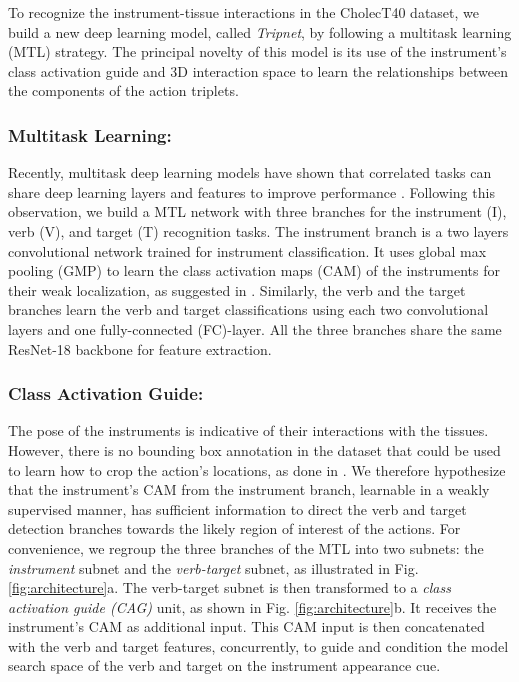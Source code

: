 \documentclass[english,runningheads,a4paper]{llncs}
\begin{document}
To recognize the instrument-tissue interactions in the CholecT40 dataset, we build a new deep learning model, called \textit{Tripnet}, by following a multitask learning (MTL) strategy. The principal novelty of this model is its use of the instrument's class activation guide and 3D interaction space to learn the relationships between the components of the action triplets.


\subsubsection{Multitask Learning: }
Recently, multitask deep learning models have shown that correlated tasks can share deep learning layers and features to improve performance \cite{mondal2019multitask,jin2020multi}. Following this observation, we build a MTL network with three branches for the instrument (I), verb (V), and target (T) recognition tasks. 
The instrument branch is a two layers convolutional network trained for  instrument classification. It uses global max pooling (GMP) to learn the class activation maps (CAM) of the instruments for their weak localization, as suggested in \cite{nwoye_convlstm_ijcars2019}. 
Similarly, the verb and the target branches learn the verb and target classifications using each two convolutional layers and one fully-connected (FC)-layer. 
All the three branches share the same ResNet-18 backbone for feature extraction.


\subsubsection{Class Activation Guide: }
The pose of the instruments is indicative of their interactions with the tissues. However, there is no bounding box annotation in the dataset that could be used to learn how to crop the action's locations, as done in \cite{gkioxari_hoi_cvpr2018,xu_hoi_cvpr2019,qi_hoi_eccv2018,shen_hoi_wacv2018}. We therefore hypothesize that the instrument's CAM from the instrument branch, learnable in a weakly supervised manner, has sufficient information to direct the verb and target detection branches towards the likely region of interest of the actions. 
For convenience, we regroup the three branches of the MTL into two subnets: the \textit{instrument} subnet and the \textit{verb-target} subnet, as illustrated in Fig. \ref{fig:architecture}a.
The verb-target subnet is then transformed to a {\it class activation guide (CAG)} unit, as shown in Fig. \ref{fig:architecture}b. It receives the instrument's CAM as additional input. 
This CAM input is then concatenated with the verb and target features, concurrently, to guide and condition the model search space of the verb and target on the instrument appearance cue.
\end{document}
